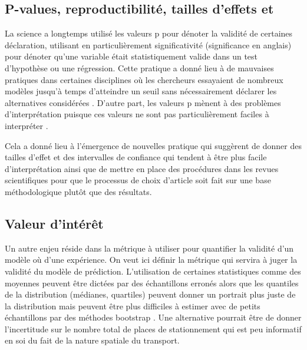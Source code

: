     \subsection{P-values, reproductibilité, tailles d'effets et }
        La science a longtemps utilisé les valeurs p pour dénoter la validité de certaines déclaration, utilisant en particulièrement significativité  (significance en anglais) pour dénoter qu'une variable était statistiquement valide dans un test d'hypothèse ou une régression. Cette pratique a donné lieu à de mauvaises pratiques dans certaines disciplines où les chercheurs essayaient de nombreux modèles jusqu'à temps d'atteindre un seuil sans nécessairement déclarer les alternatives considérées \parencite{wasserstein_asa_2016,vidgen_p-values_2016}.  D'autre part, les valeurs p mènent à des problèmes d'interprétation puisque ces valeurs ne sont pas particulièrement faciles à interpréter \parencite{cumming_understanding_2012}.\par
        Cela a donné lieu à l'émergence de nouvelles pratique qui suggèrent de donner des tailles d'effet et des intervalles de confiance qui tendent à être plus facile d'interprétation ainsi que de mettre en place des procédures dans les revues scientifiques pour que le processus de choix d'article soit fait sur une base méthodologique plutôt que des résultats. 
    \subsection{Valeur d'intérêt}
        Un autre enjeu réside dans la métrique à utiliser pour quantifier la validité d'un modèle où d'une expérience. On veut ici définir la métrique qui servira à juger la validité du modèle de prédiction. L'utilisation de certaines statistiques comme des moyennes peuvent être dictées par des échantillons erronés alors que les quantiles de la distribution (médianes, quartiles) peuvent donner un portrait plus juste de la distribution mais peuvent être plus difficiles à estimer avec de petits échantillons par des méthodes bootstrap \parencite{davison_bootstrap_1999}. Une alternative pourrait être de donner l'incertitude sur le nombre total de places de stationnement qui est peu informatif en soi du fait de la nature spatiale du transport. \par
